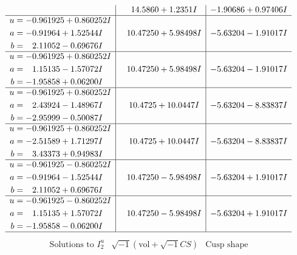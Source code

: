 \documentclass[1p]{elsarticle_modified}
\theoremstyle{definition}
\newcommand{\I}{\sqrt{-1}}
\begin{document}
$$\begin{array}{c|c|c}
 & \phantom{-}14.5860 + 1.2351 I & -1.90686 + 0.97406 I \\ \hline\begin{aligned}
u &= -0.961925 + 0.860252 I \\
a &= -0.91964 + 1.52544 I \\
b &= \phantom{-}2.11052 - 0.69676 I\end{aligned}
 & \phantom{-}10.47250 + 5.98498 I & -5.63204 - 1.91017 I \\ \hline\begin{aligned}
u &= -0.961925 + 0.860252 I \\
a &= \phantom{-}1.15135 - 1.57072 I \\
b &= -1.95858 + 0.06200 I\end{aligned}
 & \phantom{-}10.47250 + 5.98498 I & -5.63204 - 1.91017 I \\ \hline\begin{aligned}
u &= -0.961925 + 0.860252 I \\
a &= \phantom{-}2.43924 - 1.48967 I \\
b &= -2.95999 - 0.50087 I\end{aligned}
 & \phantom{-}10.4725 + 10.0447 I & -5.63204 - 8.83837 I \\ \hline\begin{aligned}
u &= -0.961925 + 0.860252 I \\
a &= -2.51589 + 1.71297 I \\
b &= \phantom{-}3.43373 + 0.94983 I\end{aligned}
 & \phantom{-}10.4725 + 10.0447 I & -5.63204 - 8.83837 I \\ \hline\begin{aligned}
u &= -0.961925 - 0.860252 I \\
a &= -0.91964 - 1.52544 I \\
b &= \phantom{-}2.11052 + 0.69676 I\end{aligned}
 & \phantom{-}10.47250 - 5.98498 I & -5.63204 + 1.91017 I \\ \hline\begin{aligned}
u &= -0.961925 - 0.860252 I \\
a &= \phantom{-}1.15135 + 1.57072 I \\
b &= -1.95858 - 0.06200 I\end{aligned}
 & \phantom{-}10.47250 - 5.98498 I & -5.63204 + 1.91017 I\\
 \hline 
 \end{array}$$\newpage$$\begin{array}{c|c|c}  
\text{Solutions to }I^u_{2}& \I (\text{vol} + \sqrt{-1}CS) & \text{Cusp shape}\\

\end{array}$$
\end{document}
